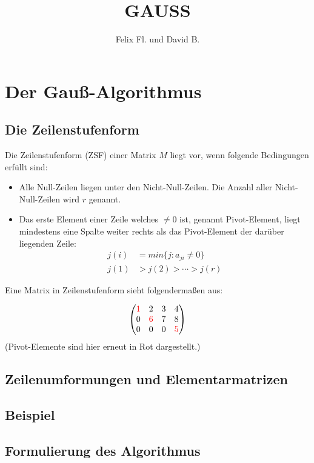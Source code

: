 \documentclass{scrartcl}
\title{GAUSS}
\author{Felix Fl. und David B.}
\begin{document}
\maketitle

\tableofcontents
\newpage

\section{Der Gauß-Algorithmus}


\subsection{Die Zeilenstufenform}
Die Zeilenstufenform (ZSF) einer Matrix $M$ liegt vor, wenn folgende Bedingungen erfüllt sind:
\begin{itemize}
\item Alle Null-Zeilen liegen unter den Nicht-Null-Zeilen. Die Anzahl aller Nicht-Null-Zeilen wird $r$ genannt.
\item Das erste Element einer Zeile welches $\neq 0$ ist, genannt Pivot-Element, liegt mindestens eine Spalte weiter rechts als das Pivot-Element der darüber liegenden Zeile: 
\begin{align*}
	j(i) & = min\{j: a_{ji} \neq 0 \} \\
	j(1) & > j(2) > \cdots > j(r)
\end{align*} 
\end{itemize}

Eine Matrix in Zeilenstufenform sieht folgendermaßen aus:

\[ \begin{pmatrix}{\color{red}1}
& 2 & 3 & 4\\ 
0 &{\color{red}6}& 7 & 8  \\ 
0 & 0 & 0 &{\color{red}5}
\end{pmatrix} \]
(Pivot-Elemente sind hier erneut in Rot dargestellt.)

\subsection{Zeilenumformungen und Elementarmatrizen}


\subsection{Beispiel}


\subsection{Formulierung des Algorithmus}

\end{document}
